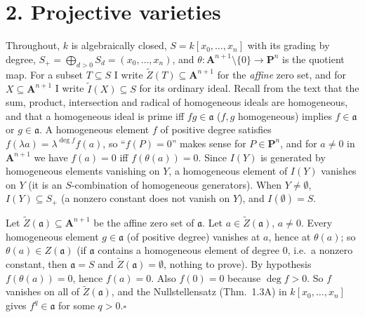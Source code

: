 \documentclass[11pt]{article}
\begin{document}
\section*{2. Projective varieties}

Throughout, $k$ is algebraically closed, $S=k[x_0,\dots,x_n]$ with its grading by degree, $S_+=\bigoplus_{d>0}S_d=(x_0,\dots,x_n)$, and $\theta:\mathbf A^{n+1}\setminus\{0\}\to\mathbf P^n$ is the quotient map. For a subset $T\subseteq S$ I write $\widetilde Z(T)\subseteq\mathbf A^{n+1}$ for the \emph{affine} zero set, and for $X\subseteq\mathbf A^{n+1}$ I write $\widetilde I(X)\subseteq S$ for its ordinary ideal. Recall from the text that the sum, product, intersection and radical of homogeneous ideals are homogeneous, and that a homogeneous ideal is prime iff $fg\in\mathfrak a$ ($f,g$ homogeneous) implies $f\in\mathfrak a$ or $g\in\mathfrak a$. A homogeneous element $f$ of positive degree satisfies $f(\lambda a)=\lambda^{\deg f}f(a)$, so ``$f(P)=0$'' makes sense for $P\in\mathbf P^n$, and for $a\neq0$ in $\mathbf A^{n+1}$ we have $f(a)=0$ iff $f(\theta(a))=0$. Since $I(Y)$ is generated by homogeneous elements vanishing on $Y$, a homogeneous element of $I(Y)$ vanishes on $Y$ (it is an $S$-combination of homogeneous generators). When $Y\ne\emptyset$, $I(Y)\subseteq S_+$ (a nonzero constant does not vanish on $Y$), and $I(\emptyset)=S$.

\pf
Let $\widetilde Z(\mathfrak a)\subseteq\mathbf A^{n+1}$ be the affine zero set of $\mathfrak a$. Let $a\in\widetilde Z(\mathfrak a)$, $a\neq 0$. Every homogeneous element $g\in\mathfrak a$ (of positive degree) vanishes at $a$, hence at $\theta(a)$; so $\theta(a)\in Z(\mathfrak a)$ (if $\mathfrak a$ contains a homogeneous element of degree $0$, i.e.\ a nonzero constant, then $\mathfrak a=S$ and $\widetilde Z(\mathfrak a)=\emptyset$, nothing to prove). By hypothesis $f(\theta(a))=0$, hence $f(a)=0$. Also $f(0)=0$ because $\deg f>0$. So $f$ vanishes on all of $\widetilde Z(\mathfrak a)$, and the Nullstellensatz (Thm.~1.3A) in $k[x_0,\dots,x_n]$ gives $f^q\in\mathfrak a$ for some $q>0$.\hfill$\square$
\end{document}
